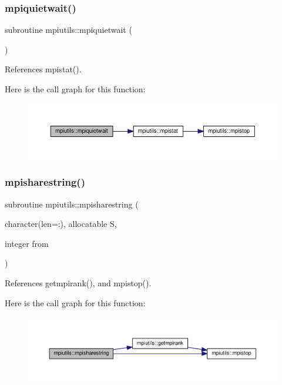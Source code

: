 \subsubsection{\texorpdfstring{mpiquietwait()}{mpiquietwait()}}
{\footnotesize\ttfamily subroutine mpiutils\+::mpiquietwait (\begin{DoxyParamCaption}{ }\end{DoxyParamCaption})}



References mpistat().

Here is the call graph for this function\+:
\nopagebreak
\begin{figure}[H]
\begin{center}
\leavevmode
\includegraphics[width=350pt]{namespacempiutils_a81a7de07e984011ee5f1d69d403e6006_cgraph}
\end{center}
\end{figure}
\mbox{\label{namespacempiutils_a09da810020699894dfe6a3da8dd985c8}} 
\subsubsection{\texorpdfstring{mpisharestring()}{mpisharestring()}}
{\footnotesize\ttfamily subroutine mpiutils\+::mpisharestring (\begin{DoxyParamCaption}\item[{character(len=\+:), allocatable}]{S,  }\item[{integer}]{from }\end{DoxyParamCaption})}



References getmpirank(), and mpistop().

Here is the call graph for this function\+:
\nopagebreak
\begin{figure}[H]
\begin{center}
\leavevmode
\includegraphics[width=350pt]{namespacempiutils_a09da810020699894dfe6a3da8dd985c8_cgraph}
\end{center}
\end{figure}
\mbox{\label{namespacempiutils_af717f5183b6db768a0a9517d4737805e}} 
